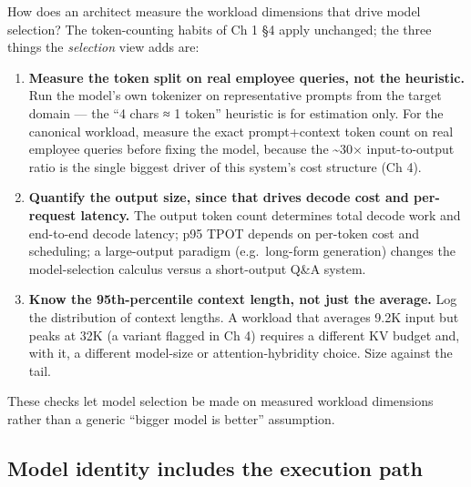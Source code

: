 \label{measurement}


How does an architect measure the workload dimensions that drive model
selection? The token-counting habits of Ch 1 §4 apply unchanged; the
three things the \emph{selection} view adds are:

\begin{enumerate}
\def\labelenumi{\arabic{enumi}.}
\tightlist
\item
  \textbf{Measure the token split on real employee queries, not the
  heuristic.} Run the model's own tokenizer on representative prompts
  from the target domain --- the ``4 chars ≈ 1 token'' heuristic is for
  estimation only. For the canonical workload, measure the exact
  prompt+context token count on real employee queries before fixing the
  model, because the \textasciitilde30× input-to-output ratio is the
  single biggest driver of this system's cost structure (Ch 4).
\item
  \textbf{Quantify the output size, since that drives decode cost and
  per-request latency.} The output token count determines total decode
  work and end-to-end decode latency; p95 TPOT depends on per-token cost
  and scheduling; a large-output paradigm (e.g.~long-form generation)
  changes the model-selection calculus versus a short-output Q\&A
  system.
\item
  \textbf{Know the 95th-percentile context length, not just the
  average.} Log the distribution of context lengths. A workload that
  averages 9.2K input but peaks at 32K (a variant flagged in Ch 4)
  requires a different KV budget and, with it, a different model-size or
  attention-hybridity choice. Size against the tail.
\end{enumerate}

These checks let model selection be made on measured workload dimensions
rather than a generic ``bigger model is better'' assumption.

\subsection{Model identity includes the execution
path}\label{model-identity-includes-the-execution-path}

